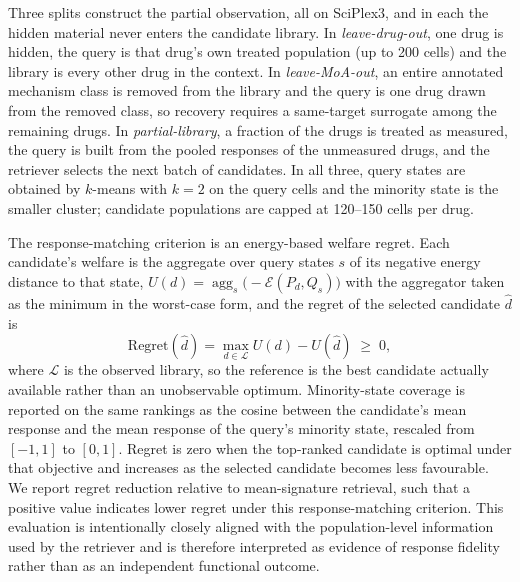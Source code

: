 \documentclass[11pt,letterpaper]{article}
\begin{document}
Three splits construct the partial observation, all on SciPlex3, and in each the hidden material
never enters the candidate library\cite{Leakage}. In \emph{leave-drug-out},
one drug is hidden, the query is that drug's own treated population (up to 200 cells) and the
library is every other drug in the context. In \emph{leave-MoA-out}, an entire annotated
mechanism class is removed from the library and the query is one drug drawn from the removed
class, so recovery requires a same-target surrogate among the remaining drugs. In
\emph{partial-library}, a fraction of the drugs is treated as measured, the query is built from
the pooled responses of the unmeasured drugs, and the retriever selects the next batch of
candidates. In all three, query states are obtained by $k$-means with $k=2$ on the query cells
and the minority state is the smaller cluster; candidate populations are capped at 120--150
cells per drug.

The response-matching criterion is an energy-based welfare regret. Each candidate's welfare is
the aggregate over query states $s$ of its negative energy distance to that state,
$U(d)=\operatorname{agg}_s\big(-\mathcal{E}(P_d,Q_s)\big)$ with the aggregator taken as the
minimum in the worst-case form, and the regret of the selected candidate $\hat d$ is
\[
\mathrm{Regret}(\hat d)=\max_{d\in\mathcal{L}}U(d)-U(\hat d)\;\ge\;0,
\]
where $\mathcal{L}$ is the observed library, so the reference is the best candidate actually
available rather than an unobservable optimum. Minority-state coverage is reported on the same
rankings as the cosine between the candidate's mean response and the mean response of the
query's minority state, rescaled from $[-1,1]$ to $[0,1]$. Regret is zero when the top-ranked
candidate is optimal under that objective and increases as the selected candidate becomes less
favourable. We report regret reduction relative to mean-signature retrieval, such that a positive
value indicates lower regret under this response-matching criterion. This evaluation is intentionally
closely aligned with the population-level information used by the retriever and is therefore
interpreted as evidence of response fidelity rather than as an independent functional outcome.
\end{document}
